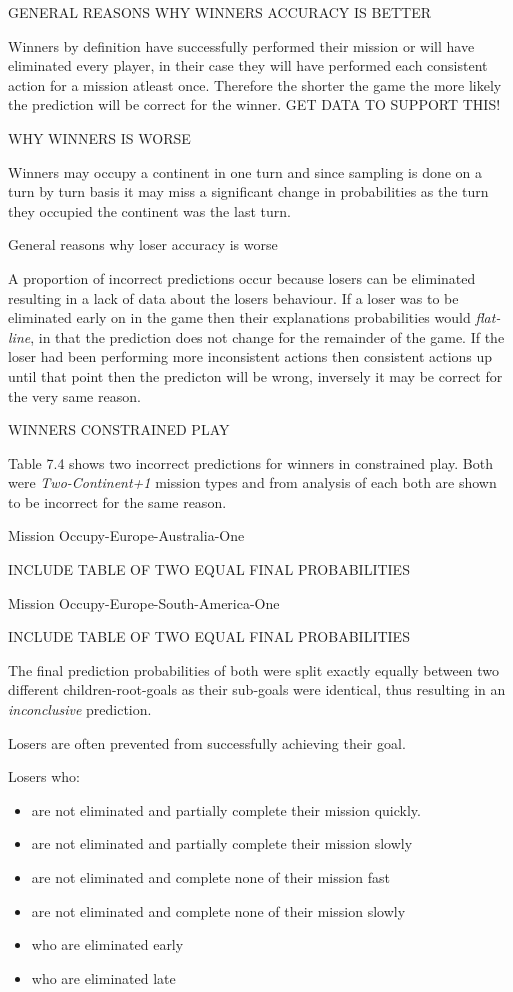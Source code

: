 \documentclass[parskip]{cs4rep}
\begin{document}
GENERAL REASONS WHY WINNERS ACCURACY IS BETTER

Winners by definition have successfully performed their mission or will have eliminated every player, in their case they will have performed each consistent action for a mission atleast once. Therefore the shorter the game the more likely the prediction will be correct for the winner. GET DATA TO SUPPORT THIS!

WHY WINNERS IS WORSE

Winners may occupy a continent in one turn and since sampling is done on a turn by turn basis it may miss a significant change in probabilities as the turn they occupied the continent was the last turn.

General reasons why loser accuracy is worse

A proportion of incorrect predictions occur because losers can be eliminated resulting in a lack of data about the losers behaviour. If a loser was to be eliminated early on in the game then their explanations probabilities would \textit{flat-line}, in that the prediction does not change for the remainder of the game. If the loser had been performing more inconsistent actions then consistent actions up until that point then the predicton will be wrong, inversely it may be correct for the very same reason.

WINNERS CONSTRAINED PLAY

Table 7.4 shows two incorrect predictions for winners in constrained play. Both were \textit{Two-Continent+1} mission types and from analysis of each both are shown to be incorrect for the same reason. 

Mission Occupy-Europe-Australia-One

INCLUDE TABLE OF TWO EQUAL FINAL PROBABILITIES

Mission Occupy-Europe-South-America-One

INCLUDE TABLE OF TWO EQUAL FINAL PROBABILITIES

The final prediction probabilities of both were split exactly equally between two different children-root-goals as their sub-goals were identical, thus resulting in an \textit{inconclusive} prediction.

Losers are often prevented from successfully achieving their goal.

Losers who:

\begin{itemize}
\item
are not eliminated and partially complete their mission quickly.
\item
are not eliminated and partially complete their mission slowly
\item
are not eliminated and complete none of their mission fast
\item
are not eliminated and complete none of their mission slowly
\item
who are eliminated early
\item
who are eliminated late
\end{itemize}
\end{document}
